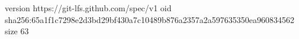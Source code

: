 version https://git-lfs.github.com/spec/v1
oid sha256:65a1f1c7298e2d3bd29bf430a7c10489b876a2357a2a597635350ea960834562
size 63
